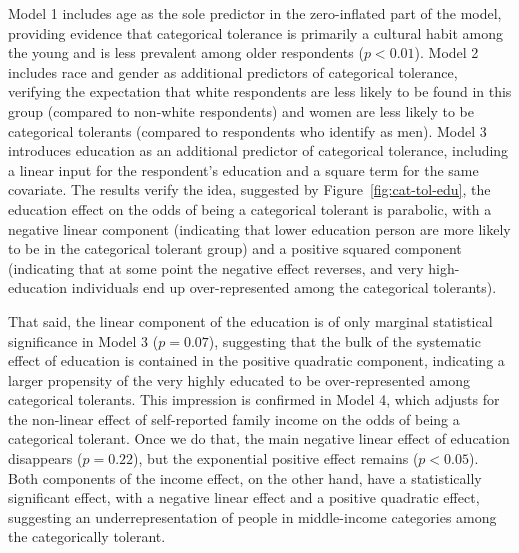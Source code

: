 \documentclass[12pt]{article}
\begin{document}
Model 1 includes age as the sole predictor in the zero-inflated part of the model, providing evidence that categorical tolerance is primarily a cultural habit among the young and is less prevalent among older respondents ($p < 0.01$). Model 2 includes race and gender as additional predictors of categorical tolerance, verifying the expectation that white respondents are less likely to be found in this group (compared to non-white respondents) and women are less likely to be categorical tolerants (compared to respondents who identify as men). Model 3 introduces education as an additional predictor of categorical tolerance, including a linear input for the respondent's education and a square term for the same covariate. The results verify the idea, suggested by Figure~\ref{fig:cat-tol-edu}, the education effect on the odds of being a categorical tolerant is parabolic, with a negative linear component (indicating that lower education person are more likely to be in the categorical tolerant group) and a positive squared component (indicating that at some point the negative effect reverses, and very high-education individuals end up over-represented among the categorical tolerants). 

That said, the linear component of the education is of only marginal statistical significance in Model 3 ($p = 0.07$), suggesting that the bulk of the systematic effect of education is contained in the positive quadratic component, indicating a larger propensity of the very highly educated to be over-represented among categorical tolerants. This impression is confirmed in Model 4, which adjusts for the non-linear effect of self-reported family income on the odds of being a categorical tolerant. Once we do that, the main negative linear effect of education disappears ($p = 0.22$), but the exponential positive effect remains ($p < 0.05$). Both components of the income effect, on the other hand, have a statistically significant effect, with a negative linear effect and a positive quadratic effect, suggesting an underrepresentation of people in middle-income categories among the categorically tolerant. 
\end{document}
